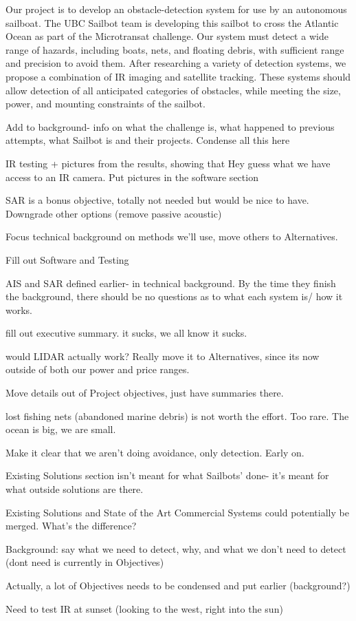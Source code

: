 Our project is to develop an obstacle-detection system for use by an autonomous sailboat.  The UBC Sailbot team is developing this sailbot to cross the Atlantic Ocean as part of the Microtransat challenge.  Our system must detect a wide range of hazards, including boats, nets, and floating debris, with sufficient range and precision to avoid them.  After researching a variety of detection systems, we propose a combination of IR imaging and satellite tracking.  These systems should allow detection of all anticipated categories of obstacles, while meeting the size, power, and mounting constraints of the sailbot.




Add to background- info on what the challenge is, what  happened to previous attempts, what Sailbot is and their projects. Condense all this here

IR testing + pictures from the results, showing that Hey guess what we have access to an IR camera. Put pictures in the software section

SAR is a bonus objective, totally not needed but would be nice to have. Downgrade other options (remove passive acoustic)

Focus technical background on methods we'll use, move others to Alternatives.

Fill out Software and Testing

AIS and SAR defined earlier- in technical background. By the time they finish the background, there should be no questions as to what each system is/ how it works.

fill out executive summary. it sucks, we all know it sucks.

would LIDAR actually work? Really move it to Alternatives, since its now outside of both our power and price ranges.

Move details out of Project objectives, just have summaries there.

lost fishing nets (abandoned marine debris) is not worth the effort. Too rare. The ocean is big, we are small.

Make it clear that we aren't doing avoidance, only detection. Early on.

Existing Solutions section isn't meant for what Sailbots' done- it's meant for what outside solutions are there.

Existing Solutions and State of the Art Commercial Systems could potentially be merged. What's the difference?

Background: say what we need to detect, why, and what we don't need to detect (dont need is currently in Objectives)

Actually, a lot of Objectives needs to be condensed and put earlier (background?)

Need to test IR at sunset (looking to the west, right into the sun)

